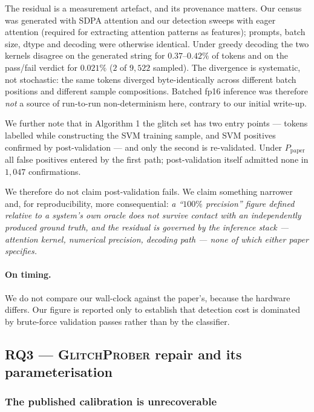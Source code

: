 \documentclass[11pt,a4paper]{article}
\newcommand{\gp}{\textsc{GlitchProber}}
\newcommand{\Ppaper}{$P_{\mathrm{paper}}$}
\begin{document}
The residual is a measurement artefact, and its provenance matters. Our census was
generated with SDPA attention and our detection sweeps with eager attention
(required for extracting attention patterns as features); prompts, batch size,
dtype and decoding were otherwise identical. Under greedy decoding the two kernels
disagree on the generated string for $0.37$--$0.42\%$ of tokens and on the
pass/fail verdict for $0.021\%$ ($2$ of $9{,}522$ sampled). The divergence is
systematic, not stochastic: the same tokens diverged byte-identically across
different batch positions and different sample compositions. Batched fp16
inference was therefore \emph{not} a source of run-to-run non-determinism here,
contrary to our initial write-up.

We further note that in Algorithm 1 the glitch set has two entry points --- tokens
labelled while constructing the SVM training sample, and SVM positives confirmed
by post-validation --- and only the second is re-validated. Under \Ppaper{} all
false positives entered by the first path; post-validation itself admitted none in
$1{,}047$ confirmations.

We therefore do not claim post-validation fails. We claim something narrower and,
for reproducibility, more consequential: \emph{a ``$100\%$ precision'' figure
defined relative to a system's own oracle does not survive contact with an
independently produced ground truth, and the residual is governed by the inference
stack --- attention kernel, numerical precision, decoding path --- none of which
either paper specifies.}

\paragraph{On timing.} We do not compare our wall-clock against the paper's,
because the hardware differs. Our figure is reported only to establish that
detection cost is dominated by brute-force validation passes rather than by the
classifier.

\subsection{RQ3 --- \gp{} repair and its parameterisation}
\label{sec:rq3}

\subsubsection{The published calibration is unrecoverable}
\end{document}

